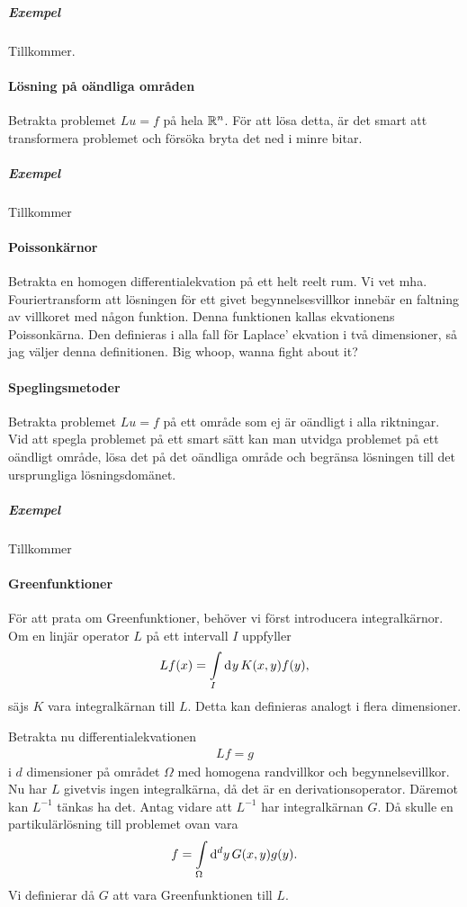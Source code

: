 \subparagraph{Exempel}
Tillkommer.

\paragraph{Lösning på oändliga områden}
Betrakta problemet $Lu = f$ på hela $\mathbb{R}^{n}$. För att lösa detta, är det smart att transformera problemet och försöka bryta det ned i minre bitar.

\subparagraph{Exempel}
Tillkommer

\paragraph{Poissonkärnor}
Betrakta en homogen differentialekvation på ett helt reelt rum. Vi vet mha. Fouriertransform att lösningen för ett givet begynnelsesvillkor innebär en faltning av villkoret med någon funktion. Denna funktionen kallas ekvationens Poissonkärna. Den definieras i alla fall för Laplace' ekvation i två dimensioner, så jag väljer denna definitionen. Big whoop, wanna fight about it?

\paragraph{Speglingsmetoder}
Betrakta problemet $Lu = f$ på ett område som ej är oändligt i alla riktningar. Vid att spegla problemet på ett smart sätt kan man utvidga problemet på ett oändligt område, lösa det på det oändliga område och begränsa lösningen till det ursprungliga lösningsdomänet.

\subparagraph{Exempel}
Tillkommer

\paragraph{Greenfunktioner}
För att prata om Greenfunktioner, behöver vi först introducera integralkärnor. Om en linjär operator $L$ på ett intervall $I$ uppfyller
\begin{align*}
	Lf(x) = \int\limits_{I}\dd[]{y}K(x, y)f(y),
\end{align*}
säjs $K$ vara integralkärnan till $L$. Detta kan definieras analogt i flera dimensioner.

Betrakta nu differentialekvationen
\begin{align*}
	Lf = g
\end{align*}
i $d$ dimensioner på området $\Omega$ med homogena randvillkor och begynnelsevillkor. Nu har $L$ givetvis ingen integralkärna, då det är en derivationsoperator. Däremot kan $L^{-1}$ tänkas ha det. Antag vidare att $L^{-1}$ har integralkärnan $G$. Då skulle en partikulärlösning till problemet ovan vara
\begin{align*}
	f = \int\limits_{\Omega}\dd[d]{y}G(x, y)g(y).
\end{align*}
Vi definierar då $G$ att vara Greenfunktionen till $L$.

